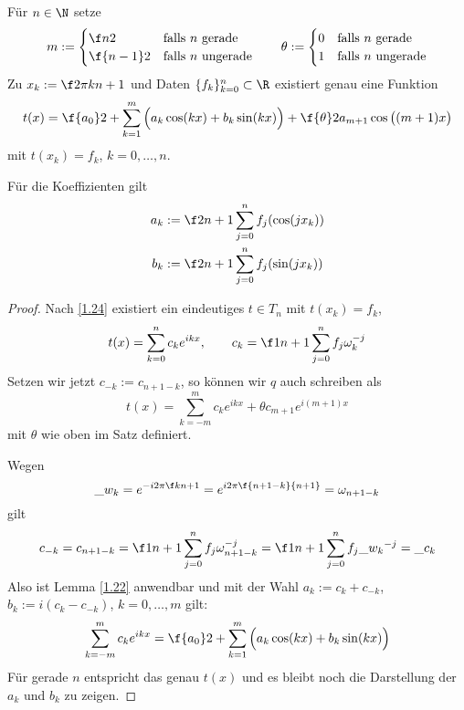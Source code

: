 \documentclass[11pt]{scrbook}
\begin{document}
\begin{st}
	\label{1.25}
	Für $n\in \N$ setze 
	\[
		m:= \begin{cases} \f n2 & \text{falls $n$ gerade} \\
			\f {n-1}2 & \text{falls $n$ ungerade}\end{cases} 
		\qquad 
		\theta := \begin{cases} 0 & \text{falls $n$ gerade} \\ 1 & \text{falls $n$ ungerade}\end{cases}
	\]
	Zu $x_k:=\f 2\pi k{n+1}$ und Daten $\{f_k\}_{k=0}^n\subset \R$ existiert genau eine Funktion
	\[
		t(x) = \f {a_0}2 + \sum_{k=1}^m \Big(a_k \cos(kx) + b_k \sin(kx)\Big) + \f{\theta}2 a_{m+1}\cos\big((m+1)x\big)
	\]
	mit $t(x_k) = f_k$, $k=0,\dotsc,n$.

	Für die Koeffizienten gilt
	\begin{align*}
		a_k &:= \f 2{n+1} \sum_{j=0}^n f_j(\cos(jx_k))\\
		b_k &:= \f 2{n+1} \sum_{j=0}^n f_j(\sin(jx_k))
	\end{align*}
	\begin{proof}
		Nach \ref{1.24} existiert ein eindeutiges $t\in T_n$ mit $t(x_k)=f_k$,
		\[
			t(x) = \sum_{k=0}^n c_k e^{ikx}, \qquad c_k = \f 1{n+1}\sum_{j=0}^n f_j \omega_k^{-j}
		\]
		Setzen wir jetzt $c_{-k} := c_{n+1-k}$, so können wir $q$ auch schreiben als
		\[
			t(x) = \sum_{k=-m}^m c_k e^{ikx} + \theta c_{m+1} e^{i(m+1)x}
		\]
		mit $\theta$ wie oben im Satz definiert.

		Wegen
		\[
			\_{w_k} = e^{-i 2\pi \f k{n+1}} = e^{i 2\pi \f {n+1-k}{n+1}} = \omega_{n+1-k}
		\]
		gilt
		\[
			c_{-k} = c_{n+1-k} = \f 1{n+1}\sum_{j=0}^n f_j \omega_{n+1-k}^{-j} = \f 1{n+1}\sum_{j=0}^n f_j\_{w_k}^{-j} = \_{c_k}
		\]
		Also ist Lemma \ref{1.22} anwendbar und mit der Wahl $a_k := c_k +c_{-k}$, $b_k := i(c_k-c_{-k})$, $k=0,\dotsc, m$ gilt:
		\[
			\sum_{k=-m}^m c_k e^{ikx} = \f{a_0}2 + \sum_{k=1}^m \Big(a_k \cos(kx) + b_k \sin(kx) \Big)
		\]
		Für gerade $n$ entspricht das genau $t(x)$ und es bleibt noch die Darstellung der $a_k$ und $b_k$ zu zeigen.


\end{proof}
\end{st}
\end{document}

